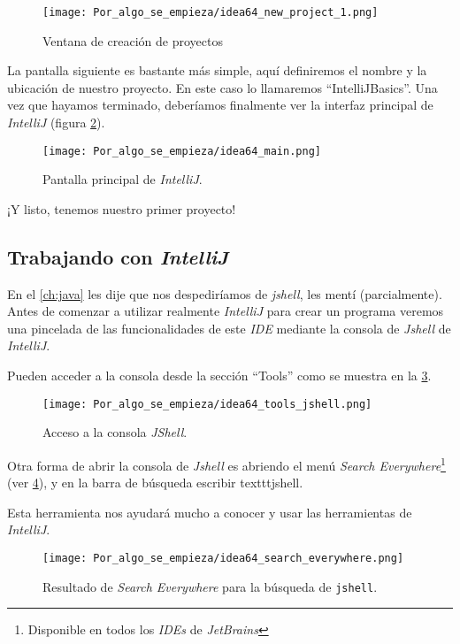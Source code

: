     \begin{figure}[ht!]
      \centering
      \texttt{[image: Por\_algo\_se\_empieza/idea64\_new\_project\_1.png]}
      \caption{Ventana de creación de proyectos}
      \label{fig:intellij-new-project-1}
    \end{figure}

    La pantalla siguiente es bastante más simple, aquí definiremos el nombre y la ubicación de 
    nuestro proyecto.
    En este caso lo llamaremos \enquote{IntelliJBasics}.
    Una vez que hayamos terminado, deberíamos finalmente ver la interfaz principal de 
    \textit{IntelliJ} (figura \ref{fig:intellij-main}).

    \begin{figure}[ht!]
      \centering
      \texttt{[image: Por\_algo\_se\_empieza/idea64\_main.png]}
      \caption{Pantalla principal de \textit{IntelliJ}.}
      \label{fig:intellij-main}
    \end{figure}

    ¡Y listo, tenemos nuestro primer proyecto!

  \subsection{Trabajando con \textit{IntelliJ}}
    En el \cref{ch:java} les dije que nos despediríamos de \textit{jshell}, les mentí
    (parcialmente).
    Antes de comenzar a utilizar realmente \textit{IntelliJ} para crear un programa veremos una
    pincelada de las funcionalidades de este \textit{IDE} mediante la consola de \textit{Jshell}
    de \textit{IntelliJ}.

    Pueden acceder a la consola desde la sección \enquote{Tools} como se muestra en la 
    \cref{fig:tools-jshell}.

    \begin{figure}[ht!]
      \centering
      \texttt{[image: Por\_algo\_se\_empieza/idea64\_tools\_jshell.png]}
      \caption{Acceso a la consola \textit{JShell}.}
      \label{fig:tools-jshell}
    \end{figure}

    \begin{tcolorbox}[enhanced, breakable, title=\textit{Search Everywere}]
      Otra forma de abrir la consola de \textit{Jshell} es abriendo el menú \textit{Search 
      Everywhere}\footnote{Disponible en todos los \textit{IDEs} de \textit{JetBrains}} 
      (ver \cref{fig:idea64-search-everywhere}), y en la barra de búsqueda escribir 
      texttt{jshell}.

      Esta herramienta nos ayudará mucho a conocer y usar las herramientas de \textit{IntelliJ}.

      \begin{figure}[H]
        \centering
        \texttt{[image: Por\_algo\_se\_empieza/idea64\_search\_everywhere.png]}
        \caption{Resultado de \textit{Search Everywhere} para la búsqueda de \texttt{jshell}.}
        \label{fig:idea64-search-everywhere}
      \end{figure}
    \end{tcolorbox}

